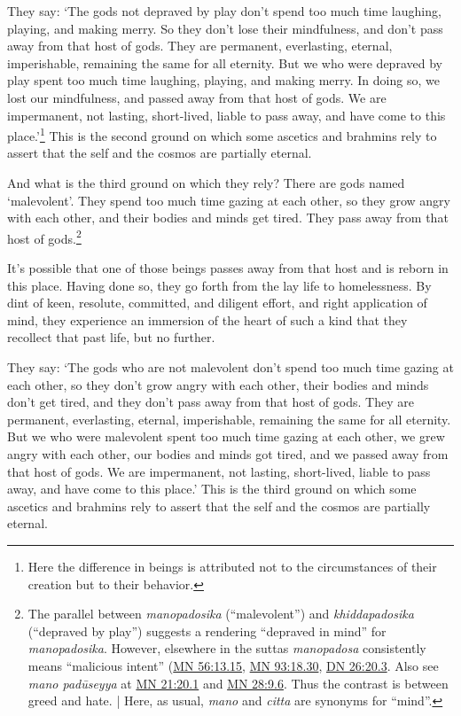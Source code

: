 \documentclass[12pt,openany]{book}%
\begin{document}
They say: ‘The gods not depraved by play don’t spend too much time laughing, playing, and making merry. So they don’t lose their mindfulness, and don’t pass away from that host of gods. They are permanent, everlasting, eternal, imperishable, remaining the same for all eternity. But we who were depraved by play spent too much time laughing, playing, and making merry. In doing so, we lost our mindfulness, and passed away from that host of gods. We are impermanent, not lasting, short-lived, liable to pass away, and have come to this place.’\footnote{Here the difference in beings is attributed not to the circumstances of their creation but to their behavior. } This is the second ground on which some ascetics and brahmins rely to assert that the self and the cosmos are partially eternal. 

And what is the third ground on which they rely? There are gods named ‘malevolent’. They spend too much time gazing at each other, so they grow angry with each other, and their bodies and minds get tired. They pass away from that host of gods.\footnote{The parallel between \textit{manopadosika} (“malevolent”) and \textit{khiddapadosika} (“depraved by play”) suggests a rendering “depraved in mind” for \textit{manopadosika}. However, elsewhere in the suttas \textit{manopadosa} consistently means “malicious intent” (\href{https://suttacentral.net/mn56/en/sujato\#13.15}{MN 56:13.15}, \href{https://suttacentral.net/mn93/en/sujato\#18.30}{MN 93:18.30}, \href{https://suttacentral.net/dn26/en/sujato\#20.3}{DN 26:20.3}. Also see \textit{mano \textsanskrit{padūseyya}} at \href{https://suttacentral.net/mn21/en/sujato\#20.1}{MN 21:20.1} and \href{https://suttacentral.net/mn28/en/sujato\#9.6}{MN 28:9.6}. Thus the contrast is between greed and hate. | Here, as usual, \textit{mano} and \textit{citta} are synonyms for “mind”. } 

It’s possible that one of those beings passes away from that host and is reborn in this place. Having done so, they go forth from the lay life to homelessness. By dint of keen, resolute, committed, and diligent effort, and right application of mind, they experience an immersion of the heart of such a kind that they recollect that past life, but no further. 

They say: ‘The gods who are not malevolent don’t spend too much time gazing at each other, so they don’t grow angry with each other, their bodies and minds don’t get tired, and they don’t pass away from that host of gods. They are permanent, everlasting, eternal, imperishable, remaining the same for all eternity. But we who were malevolent spent too much time gazing at each other, we grew angry with each other, our bodies and minds got tired, and we passed away from that host of gods. We are impermanent, not lasting, short-lived, liable to pass away, and have come to this place.’ This is the third ground on which some ascetics and brahmins rely to assert that the self and the cosmos are partially eternal. 
\end{document}
